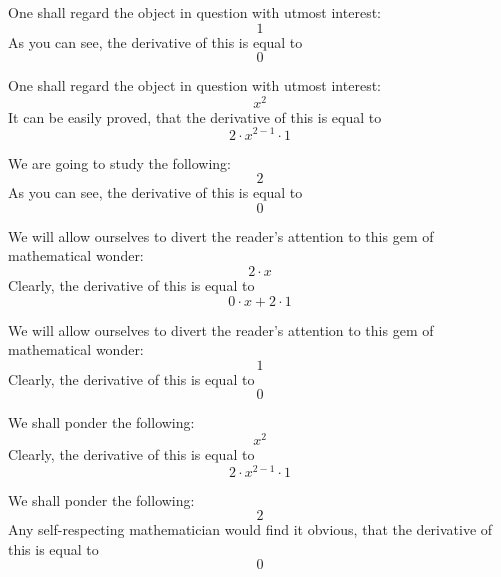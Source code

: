 \documentclass{article}
\begin{document}
One shall regard the object in question with utmost interest:
\begin{equation}
1 
\end{equation}
As you can see, the derivative of this is equal to
\begin{equation}
0 
\end{equation}

One shall regard the object in question with utmost interest:
\begin{equation}
x ^{2 } 
\end{equation}
It can be easily proved, that the derivative of this is equal to
\begin{equation}
2 \cdot x ^{2 - 1 } \cdot 1 
\end{equation}

We are going to study the following:
\begin{equation}
2 
\end{equation}
As you can see, the derivative of this is equal to
\begin{equation}
0 
\end{equation}

We will allow ourselves to divert the reader's attention to this gem of mathematical wonder:
\begin{equation}
2 \cdot x 
\end{equation}
Clearly, the derivative of this is equal to
\begin{equation}
0 \cdot x + 2 \cdot 1 
\end{equation}

We will allow ourselves to divert the reader's attention to this gem of mathematical wonder:
\begin{equation}
1 
\end{equation}
Clearly, the derivative of this is equal to
\begin{equation}
0 
\end{equation}

We shall ponder the following:
\begin{equation}
x ^{2 } 
\end{equation}
Clearly, the derivative of this is equal to
\begin{equation}
2 \cdot x ^{2 - 1 } \cdot 1 
\end{equation}

We shall ponder the following:
\begin{equation}
2 
\end{equation}
Any self-respecting mathematician would find it obvious, that the derivative of this is equal to
\begin{equation}
0 
\end{equation}
\end{document}
